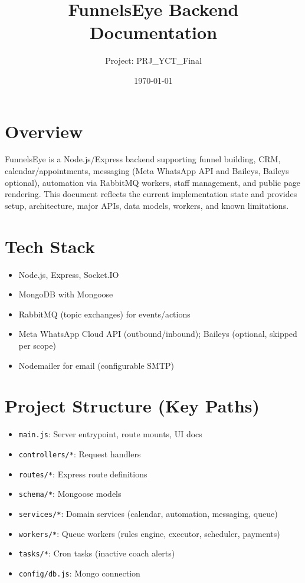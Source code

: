 \documentclass[11pt,a4paper]{article}
\title{FunnelsEye Backend Documentation}
\author{Project: PRJ\_YCT\_Final}
\date{\today}
\begin{document}
\maketitle
\tableofcontents

\section{Overview}
FunnelsEye is a Node.js/Express backend supporting funnel building, CRM, calendar/appointments, messaging (Meta WhatsApp API and Baileys, Baileys optional), automation via RabbitMQ workers, staff management, and public page rendering.\newline
This document reflects the current implementation state and provides setup, architecture, major APIs, data models, workers, and known limitations.

\section{Tech Stack}
\begin{itemize}[noitemsep]
  \item Node.js, Express, Socket.IO
  \item MongoDB with Mongoose
  \item RabbitMQ (topic exchanges) for events/actions
  \item Meta WhatsApp Cloud API (outbound/inbound); Baileys (optional, skipped per scope)
  \item Nodemailer for email (configurable SMTP)
\end{itemize}

\section{Project Structure (Key Paths)}
\begin{itemize}[noitemsep]
  \item \texttt{main.js}: Server entrypoint, route mounts, UI docs
  \item \texttt{controllers/*}: Request handlers
  \item \texttt{routes/*}: Express route definitions
  \item \texttt{schema/*}: Mongoose models
  \item \texttt{services/*}: Domain services (calendar, automation, messaging, queue)
  \item \texttt{workers/*}: Queue workers (rules engine, executor, scheduler, payments)
  \item \texttt{tasks/*}: Cron tasks (inactive coach alerts)
  \item \texttt{config/db.js}: Mongo connection
\end{itemize}
\end{document}
